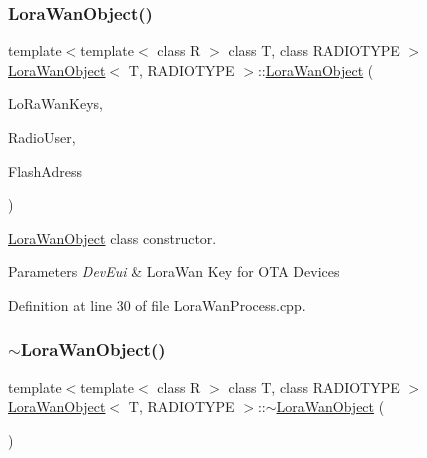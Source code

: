 \subsubsection{\texorpdfstring{Lora\+Wan\+Object()}{LoraWanObject()}}
{\footnotesize\ttfamily template$<$template$<$ class R $>$ class T, class R\+A\+D\+I\+O\+T\+Y\+PE $>$ \\
\mbox{\hyperlink{class_lora_wan_object}{Lora\+Wan\+Object}}$<$ T, R\+A\+D\+I\+O\+T\+Y\+PE $>$\+::\mbox{\hyperlink{class_lora_wan_object}{Lora\+Wan\+Object}} (\begin{DoxyParamCaption}\item[{\mbox{\hyperlink{structs_lo_ra_wan_keys}{s\+Lo\+Ra\+Wan\+Keys}}}]{Lo\+Ra\+Wan\+Keys,  }\item[{R\+A\+D\+I\+O\+T\+Y\+PE $\ast$}]{Radio\+User,  }\item[{uint32\+\_\+t}]{Flash\+Adress }\end{DoxyParamCaption})}



\mbox{\hyperlink{class_lora_wan_object}{Lora\+Wan\+Object}} class constructor. 


\begin{DoxyParams}{Parameters}
{\em Dev\+Eui} & Lora\+Wan Key for O\+TA Devices \\
\hline
\end{DoxyParams}


Definition at line 30 of file Lora\+Wan\+Process.\+cpp.

\mbox{\label{class_lora_wan_object_a9607905d493f2dee3273264b801aae6d}} 
\subsubsection{\texorpdfstring{$\sim$\+Lora\+Wan\+Object()}{~LoraWanObject()}}
{\footnotesize\ttfamily template$<$template$<$ class R $>$ class T, class R\+A\+D\+I\+O\+T\+Y\+PE $>$ \\
\mbox{\hyperlink{class_lora_wan_object}{Lora\+Wan\+Object}}$<$ T, R\+A\+D\+I\+O\+T\+Y\+PE $>$\+::$\sim$\mbox{\hyperlink{class_lora_wan_object}{Lora\+Wan\+Object}} (\begin{DoxyParamCaption}{ }\end{DoxyParamCaption})}



